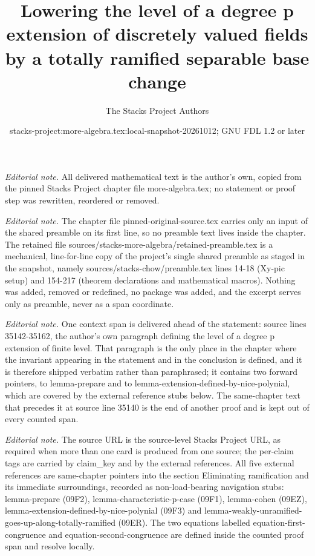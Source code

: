 \documentclass[10pt,a4paper]{amsart}
\title{Lowering the level of a degree p extension of discretely valued fields by a totally ramified separable base change}
\author{The Stacks Project Authors}
\date{stacks-project:more-algebra.tex:local-snapshot-20261012; GNU FDL 1.2 or later}
\theoremstyle{plain}
\theoremstyle{definition}
\theoremstyle{remark}
\numberwithin{equation}{subsection}
\begin{document}
\maketitle
\setcounter{subsection}{1}
\noindent\textit{Editorial note.} All delivered mathematical text is the author's own, copied from the pinned Stacks Project chapter file more-algebra.tex; no statement or proof step was rewritten, reordered or removed.\par\medskip
\noindent\textit{Editorial note.} The chapter file pinned-original-source.tex carries only an input of the shared preamble on its first line, so no preamble text lives inside the chapter. The retained file sources/stacks-more-algebra/retained-preamble.tex is a mechanical, line-for-line copy of the project's single shared preamble as staged in the snapshot, namely sources/stacks-chow/preamble.tex lines 14-18 (Xy-pic setup) and 154-217 (theorem declarations and mathematical macros). Nothing was added, removed or redefined, no package was added, and the excerpt serves only as preamble, never as a span coordinate.\par\medskip
\noindent\textit{Editorial note.} One context span is delivered ahead of the statement: source lines 35142-35162, the author's own paragraph defining the level of a degree p extension of finite level. That paragraph is the only place in the chapter where the invariant appearing in the statement and in the conclusion is defined, and it is therefore shipped verbatim rather than paraphrased; it contains two forward pointers, to lemma-prepare and to lemma-extension-defined-by-nice-polynial, which are covered by the external reference stubs below. The same-chapter text that precedes it at source line 35140 is the end of another proof and is kept out of every counted span.\par\medskip
\noindent\textit{Editorial note.} The source URL is the source-level Stacks Project URL, as required when more than one card is produced from one source; the per-claim tags are carried by claim\_key and by the external references. All five external references are same-chapter pointers into the section Eliminating ramification and its immediate surroundings, recorded as non-load-bearing navigation stubs: lemma-prepare (09F2), lemma-characteristic-p-case (09F1), lemma-cohen (09EZ), lemma-extension-defined-by-nice-polynial (09F3) and lemma-weakly-unramified-goes-up-along-totally-ramified (09ER). The two equations labelled equation-first-congruence and equation-second-congruence are defined inside the counted proof span and resolve locally.\par\medskip
\end{document}
